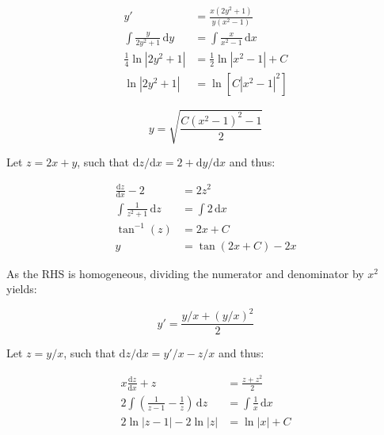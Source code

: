 \documentclass[12pt]{article}
\begin{document}

\begin{equation}
    \begin{split}
        y' &= \frac{x(2y^{2} + 1)}{y(x^{2} - 1)} \\
        \int \frac{y}{2y^{2} + 1} \, \mathrm{d}y &= \int \frac{x}{x^{2} - 1} \, \mathrm{d}x \\
        \frac{1}{4} \ln{\left\lvert 2y^{2} + 1 \right\rvert} &= \frac{1}{2} \ln{\left\lvert x^{2} - 1 \right\rvert} + C \\
        \ln{\left\lvert 2y^{2} + 1 \right\rvert} &= \ln{\left[ C \left\lvert x^{2} - 1 \right\rvert^{2} \right]}
    \end{split}
\end{equation}

\begin{equation}
    y = \sqrt{\frac{C(x^{2} - 1)^{2} - 1}{2}}
\end{equation}

Let $z = 2x + y$, such that $\mathrm{d}z/\mathrm{d}x = 2 + \mathrm{d}y/\mathrm{d}x$ and thus:

\begin{equation}
    \begin{split}
        \frac{\mathrm{d}z}{\mathrm{d}x} - 2 &= 2z^{2} \\
        \int \frac{1}{z^{2} + 1} \, \mathrm{d}z &= \int 2 \, \mathrm{d}x \\
        \tan^{-1}{(z)} &= 2x + C \\
        y &= \tan{(2x + C)} - 2x
    \end{split}
\end{equation}

As the RHS is homogeneous, dividing the numerator and denominator by $x^{2}$ yields:

\begin{equation}
    y' = \frac{y/x + (y/x)^{2}}{2}
\end{equation}

Let $z = y/x$, such that $\mathrm{d}z/\mathrm{d}x = y'/x - z/x$ and thus:

\begin{equation}
    \begin{split}
        x \frac{\mathrm{d}z}{\mathrm{d}x} + z &= \frac{z + z^{2}}{2} \\
        2\int \left( \frac{1}{z - 1} - \frac{1}{z} \right) \, \mathrm{d}z &= \int \frac{1}{x} \, \mathrm{d}x \\
        2\ln{\left\lvert z - 1 \right\rvert} - 2\ln{\left\lvert z \right\rvert} &= \ln{\left\lvert x \right\rvert} + C \\
    \end{split}
\end{equation}
\end{document}
